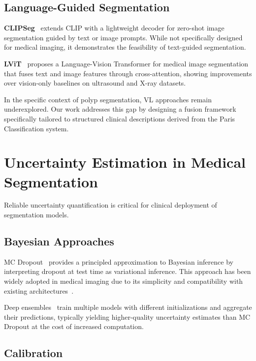 \subsection{Language-Guided Segmentation}
\label{sec:rw:langseg}

\textbf{CLIPSeg}~\cite{luddecke2022clipseg} extends CLIP with a lightweight decoder for zero-shot image segmentation guided by text or image prompts. While not specifically designed for medical imaging, it demonstrates the feasibility of text-guided segmentation.

\textbf{LViT}~\cite{li2023lvit} proposes a Language-Vision Transformer for medical image segmentation that fuses text and image features through cross-attention, showing improvements over vision-only baselines on ultrasound and X-ray datasets.

In the specific context of polyp segmentation, \ac{VL} approaches remain underexplored. Our work addresses this gap by designing a fusion framework specifically tailored to structured clinical descriptions derived from the Paris Classification system.


\section{Uncertainty Estimation in Medical Segmentation}
\label{sec:rw:uncertainty}

Reliable uncertainty quantification is critical for clinical deployment of segmentation models.

\subsection{Bayesian Approaches}
\label{sec:rw:bayesian}

\ac{MC} Dropout~\cite{gal2016dropout} provides a principled approximation to Bayesian inference by interpreting dropout at test time as variational inference. This approach has been widely adopted in medical imaging due to its simplicity and compatibility with existing architectures~\cite{leibig2017leveraging, nair2020exploring}.

Deep ensembles~\cite{lakshminarayanan2017simple} train multiple models with different initializations and aggregate their predictions, typically yielding higher-quality uncertainty estimates than \ac{MC} Dropout at the cost of increased computation.

\subsection{Calibration}
\label{sec:rw:calibration}

